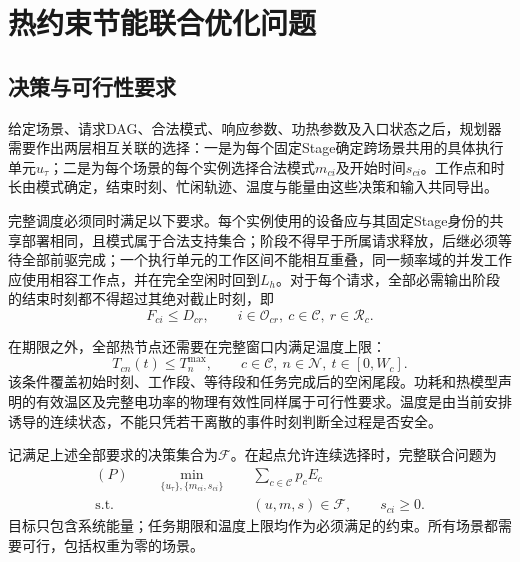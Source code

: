 \section{热约束节能联合优化问题}

\subsection{决策与可行性要求}

给定场景、请求DAG、合法模式、响应参数、功热参数及入口状态之后，规划器需要作出两层相互关联的选择：一是为每个固定Stage确定跨场景共用的具体执行单元$u_\tau$；二是为每个场景的每个实例选择合法模式$m_{ci}$及开始时间$s_{ci}$。工作点和时长由模式确定，结束时刻、忙闲轨迹、温度与能量由这些决策和输入共同导出。

完整调度必须同时满足以下要求。每个实例使用的设备应与其固定Stage身份的共享部署相同，且模式属于合法支持集合；阶段不得早于所属请求释放，后继必须等待全部前驱完成；一个执行单元的工作区间不能相互重叠，同一频率域的并发工作应使用相容工作点，并在完全空闲时回到$L_h$。对于每个请求，全部必需输出阶段的结束时刻都不得超过其绝对截止时刻，即
\begin{equation}
 F_{ci}\le D_{cr},
 \qquad i\in\mathcal O_{cr},\ c\in\mathcal C,\ r\in\mathcal R_c.
 \label{eq:c3-output-deadline}
\end{equation}

在期限之外，全部热节点还需要在完整窗口内满足温度上限：
\begin{equation}
 T_{cn}(t)\le T_n^{\max},
 \qquad c\in\mathcal C,\ n\in\mathcal N,\ t\in[0,W_c].
 \label{eq:c3-continuous-safe}
\end{equation}
该条件覆盖初始时刻、工作段、等待段和任务完成后的空闲尾段。功耗和热模型声明的有效温区及完整电功率的物理有效性同样属于可行性要求。温度是由当前安排诱导的连续状态，不能只凭若干离散的事件时刻判断全过程是否安全。

记满足上述全部要求的决策集合为$\mathcal F$。在起点允许连续选择时，完整联合问题为
\begin{equation}
 \begin{aligned}
 (P)\qquad
 \min_{\{u_\tau\},\{m_{ci},s_{ci}\}}\quad&
       \sum_{c\in\mathcal C}p_cE_c\\
 \mathrm{s.t.}\qquad&
       (u,m,s)\in\mathcal F,\qquad s_{ci}\ge0.
 \end{aligned}
 \label{eq:c3-continuous-P}
\end{equation}
目标只包含系统能量；任务期限和温度上限均作为必须满足的约束。所有场景都需要可行，包括权重为零的场景。

